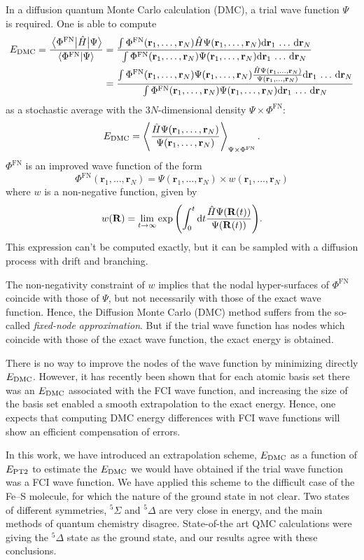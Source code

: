 \documentclass[./thesis.tex]{subfiles}
\begin{document}
\newcommand{\rn}{\mathbf{r}_1,\dots,\mathbf{r}_N}
\newcommand{\drn}{\text{d}\mathbf{r}_1\,\dots\,\text{d}\mathbf{r}_N}
In a diffusion quantum Monte Carlo calculation (DMC), a trial wave function
$\Psi$ is required. One is able to compute
\begin{align}
  \EDMC = \frac{\Hij{\Phi^{\text{FN}}}{\Psi}}{\braket{\Phi^{\text{FN}}}{\Psi}} & = 
  \frac{\int \Phi^{\text{FN}}(\rn) {\hat H}\Psi(\rn) \drn}{\int \Phi^{\text{FN}}(\rn)\Psi(\rn) \drn} \\
  & = \frac{\int \Phi^{\text{FN}}(\rn)\Psi(\rn) \frac{{\hat H}\Psi(\rn)}{\Psi(\rn)} \drn}{\int \Phi^{\text{FN}}(\rn)\Psi(\rn) \drn} 
\end{align}
as a stochastic average with the $3N$-dimensional density $\Psi \times \Phi^{\text{FN}}$:
\begin{equation}
  \EDMC = \left \langle \frac{{\hat H}\Psi(\rn)}{\Psi(\rn)} \right \rangle_{\Psi \times \Phi^{\text{FN}}}.
\end{equation}
$\Phi^{\text{FN}}$ is an improved wave function of the form
\begin{equation}
\Phi^{\text{FN}}(\rn)  = \Psi(\rn) \times w (\rn)
\end{equation}
where $w$ is a non-negative function, given by
\begin{equation}
w(\mathbf{R}) = \lim_{t \rightarrow \infty} \exp \qty( \int_0^t \text{d}t \frac{{\hat H}\Psi(\mathbf{R}(t))}{\Psi(\mathbf{R}(t))} ).
\end{equation}
This expression can't be computed exactly, but it can be sampled with a diffusion
process with drift and branching.\cite{Hammond_1994}

The non-negativity constraint of $w$ implies that the nodal
hyper-surfaces of $\Phi^{\text{FN}}$ coincide with those of $\Psi$, but not necessarily with
those of the exact wave function. Hence, the Diffusion Monte Carlo (DMC) method
suffers from the so-called \emph{fixed-node approximation}. But if the trial wave
function has nodes which coincide with those of the exact wave function, the
exact energy is obtained.

There is no way to improve the nodes of the wave function by minimizing directly $E_\text{DMC}$.
However, it has recently been shown\cite{Caffarel_2016} that for each atomic basis
set there was an $E_\text{DMC}$ associated with the FCI wave function, and increasing the
size of the basis set enabled a smooth extrapolation to the exact energy.
Hence, one expects that computing DMC energy differences with FCI wave functions will
show an efficient compensation of errors.

In this work, we have introduced an extrapolation scheme, $E_\text{DMC}$ as a function
of $E_\text{PT2}$ to estimate the $E_\text{DMC}$ we would have obtained if the trial wave
function was a FCI wave function. We have applied this scheme to the difficult
case of the Fe--S molecule, for which the nature of the ground state in not
clear. Two states of different symmetries, $^5\Sigma$ and $^5\Delta$ are very
close in energy, and the main methods of quantum chemistry disagree.
State-of-the art QMC calculations were giving the $^5\Delta$ state
as the ground state,\cite{Haghighi_Mood_2017} and our results agree with these
conclusions.



\end{document}

